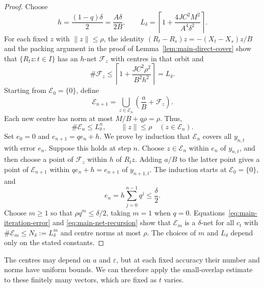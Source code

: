 \documentclass[10pt,a4paper]{amsart}
\newcommand\norm[1]{\|#1\|}
\newcommand\1{\mathbbm{1}}
\newcommand{\eps}{\varepsilon}
\begin{document}
\begin{proof}
Choose
\begin{equation}\label{eq:main-net-precision}
    h=\frac{(1-q)\delta}{2}=\frac{A\delta}{2B},
    \qquad
    L_\delta=\left\lceil1+\frac{4JC^2M^2}{A^4\delta^2}\right\rceil.
\end{equation}
For each fixed $z$ with $\norm{z}\le\rho$, the identity
$(R_t-R_s)z=-(X_t-X_s)z/B$ and the packing argument in the proof of
Lemma~\ref{lem:main-direct-cover} show that
$\{R_tz:t\in I\}$ has an $h$-net $\mathcal F_z$ with centres in that orbit and
\begin{equation*}
    \#\mathcal F_z
    \le\left\lceil1+\frac{JC^2\rho^2}{B^2h^2}\right\rceil
    =L_\delta.
\end{equation*}
Starting from $\mathcal E_0=\{0\}$, define
\begin{equation*}
    \mathcal E_{n+1}
    =\bigcup_{z\in\mathcal E_n}\left(\frac aB+\mathcal F_z\right).
\end{equation*}
Each new centre has norm at most $M/B+q\rho=\rho$. Thus,
\begin{equation}\label{eq:main-net-recursion}
    \#\mathcal E_n\le L_\delta^n,
    \qquad\norm{z}\le\rho\quad(z\in\mathcal E_n).
\end{equation}
Set $e_0=0$ and $e_{n+1}=qe_n+h$. We prove by induction that $\mathcal E_n$
covers all $y_{n,t}$ with error $e_n$. Suppose this holds at step $n$.
Choose $z\in\mathcal E_n$ within $e_n$ of $y_{n,t}$, and then choose a point
of $\mathcal F_z$ within $h$ of $R_tz$. Adding $a/B$ to the latter point gives
a point of $\mathcal E_{n+1}$ within $qe_n+h=e_{n+1}$ of $y_{n+1,t}$.
The induction starts at $\mathcal E_0=\{0\}$, and
\begin{equation*}
    e_n=h\sum_{j=0}^{n-1}q^j\le\frac\delta2.
\end{equation*}
Choose $m\ge1$ so that $\rho q^m\le\delta/2$, taking $m=1$ when $q=0$.
Equations~\eqref{eq:main-iteration-error} and \eqref{eq:main-net-recursion}
show that $\mathcal E_m$ is a $\delta$-net for all $c_t$ with
$\#\mathcal E_m\le N_\delta:=L_\delta^m$ and centre norms at most $\rho$.
The choices of $m$ and $L_\delta$ depend only on the stated constants.
\end{proof}

The centres may depend on $a$ and $\eps$, but at each fixed accuracy their
number and norms have uniform bounds. We can therefore apply the
small-overlap estimate to these finitely many vectors, which are fixed as
$t$ varies.
\end{document}
